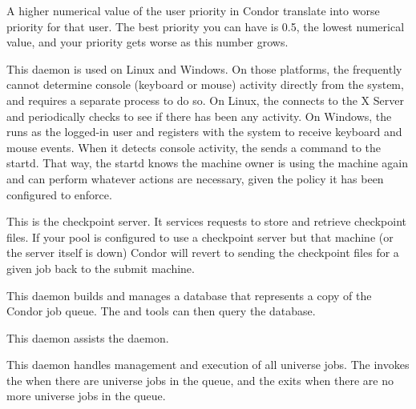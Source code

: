 \begin{description}
\Note A higher numerical value of the user priority in Condor
translate into worse priority for that user.  The best priority you
can have is 0.5, the lowest numerical value, and your priority gets
worse as this number grows.

\item[\Condor{kbdd}] This daemon
is used on Linux and Windows.
On those platforms, the  frequently cannot determine
console (keyboard or mouse) activity directly from the system, and
requires a separate process to do so.
On Linux, the
 connects to the X Server and periodically checks to see
if there has been any activity.
On Windows, the  runs as the logged-in user and registers
with the system to receive keyboard and mouse events.
When it detects console activity, the  sends a
command to the startd.  That way, the startd knows the machine owner
is using the machine again and can perform whatever actions are
necessary, given the policy it has been configured to enforce.

\item[\Condor{ckpt\_server}] This is the checkpoint server.
It services requests to store and retrieve checkpoint files.  If your
pool is configured to use a checkpoint server but that machine (or the
server itself is down) Condor will revert to sending the checkpoint
files for a given job back to the submit machine.

\item[\Condor{quill}] This daemon
builds and manages a database that represents a copy of the 
Condor job queue.
The  and  tools can then query the database.

\item[\Condor{dbmsd}] This daemon
assists the  daemon.

\item[\Condor{gridmanager}] This daemon
handles management and execution of all 
universe jobs.
The  invokes the  when
there are  universe jobs in the queue,
and the  exits when there are no more
 universe jobs in the queue.


\end{description}
